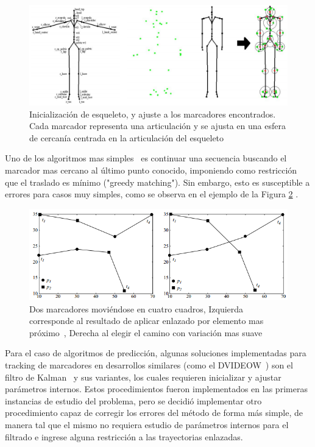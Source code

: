 \begin{figure}[ht!]
\begin{center}
\includegraphics[scale=0.6]{img/Tracking/01_skeleton_fitting_Herda.png}
\end{center}
\caption{Inicialización de esqueleto, y ajuste a los marcadores encontrados. Cada marcador representa una articulación y se ajusta en una esfera de cercanía centrada en la articulación del esqueleto}
\label{skeleton_fitting_herda}
\end{figure}

Uno de los algoritmos mas simples~\cite{survey_tracking} es continuar una secuencia buscando el marcador mas cercano al último punto conocido, imponiendo como restricción que el traslado es mínimo ("greedy matching"). Sin embargo, esto es susceptible a errores para casos muy simples, como se observa en el ejemplo de la Figura \ref{greedy_matching} .

\begin{figure}[ht!]
\begin{center}
\includegraphics[scale=0.8]{img/Tracking/01_Greedy_Matching.png}
\end{center}
\caption{Dos marcadores moviéndose en cuatro cuadros, Izquierda corresponde al resultado de aplicar enlazado por elemento mas próximo~\cite{survey_tracking}, Derecha al elegir el camino con variación mas suave}
\label{greedy_matching}
\end{figure}

Para el caso de algoritmos de predicción, algunas soluciones implementadas para tracking de marcadores en desarrollos similares (como el DVIDEOW~\cite{figueroa2003flexible}) son el filtro de Kalman~\cite{kalman} y sus variantes, los cuales requieren inicializar y ajustar parámetros internos. Estos procedimientos fueron implementados en las primeras instancias de estudio del problema, pero se decidió implementar otro procedimiento capaz de corregir los errores del método de forma más simple, de manera tal que el mismo no requiera estudio de parámetros internos para el filtrado e ingrese alguna restricción a las trayectorias enlazadas.
\\ 

